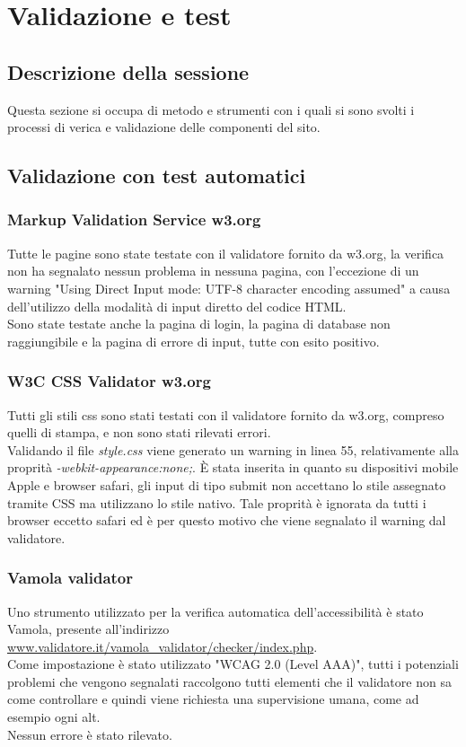 \documentclass[openany, a4paper, 12pt]{report}
\begin{document}
	\chapter{Validazione e test}
		\section{Descrizione della sessione}
			Questa sezione si occupa di metodo e strumenti con i quali si sono svolti i processi di verica e validazione delle componenti del sito.
		\section{Validazione con test automatici}
			\subsection{Markup Validation Service w3.org}
				Tutte le pagine sono state testate con il validatore fornito da w3.org, la verifica non ha segnalato nessun problema in nessuna pagina, con l'eccezione di un warning "Using Direct Input mode: UTF-8 character encoding assumed" a causa dell'utilizzo della modalità di input diretto del codice HTML.\\
				Sono state testate anche la pagina di login, la pagina di database non raggiungibile e la pagina di errore di input, tutte con esito positivo.
			\subsection{W3C CSS Validator w3.org}
				Tutti gli stili css sono stati testati con il validatore fornito da w3.org, compreso quelli di stampa, e non sono stati rilevati errori.\\
				Validando il file \textit{style.css} viene generato un warning in linea 55, relativamente alla proprità \textit{-webkit-appearance:none;}. È stata inserita in quanto su dispositivi mobile Apple e browser safari, gli input di tipo submit non accettano lo stile assegnato tramite CSS ma utilizzano lo stile nativo. Tale proprità è ignorata da tutti i browser eccetto safari ed è per questo motivo che viene segnalato il warning dal validatore.
			\subsection{Vamola validator}
				Uno strumento utilizzato per la verifica automatica dell'accessibilità è stato Vamola, presente all'indirizzo \url{www.validatore.it/vamola_validator/checker/index.php}.\\
				Come impostazione è stato utilizzato "WCAG 2.0 (Level AAA)", tutti i potenziali problemi che vengono segnalati raccolgono tutti elementi che il validatore non sa come controllare e quindi viene richiesta una supervisione umana, come ad esempio ogni alt.\\
				Nessun errore è stato rilevato.
\end{document}
